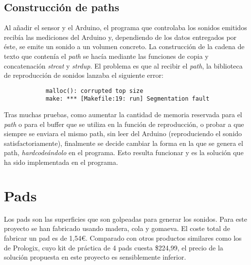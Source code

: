 
        \subsection{Construcción de paths} %
        \label{sub:ConstruccionDePaths}

            Al añadir el sensor y el Arduino, el programa que controlaba los sonidos emitidos recibía las mediciones
            del Arduino y, dependiendo de los datos entregados por éste, se emite un sonido a un volumen concreto.
            La construcción de la cadena de texto que contenía el \textit{path} se hacía mediante las funciones de
            copia y concatenación \textit{strcat} y \textit{strdup}. El problema es que al recibir el \textit{path},
            la biblioteca de reproducción de sonidos lanzaba el siguiente error:

            \begin{verbatim}
            malloc(): corrupted top size
            make: *** [Makefile:19: run] Segmentation fault
            \end{verbatim}

            Tras muchas pruebas, como aumentar la cantidad de memoria reservada para el \textit{path} o para el
            buffer que se utiliza en la función de reproducción, o probar a que siempre se enviara el mismo path,
            sin leer del Arduino (reproduciendo el sonido satisfactoriamente), finalmente se decide cambiar la forma en
            la que se genera el path, \textit{hardcodeándolo} en el programa. Esto resulta funcionar y es la solución
            que ha sido implementada en el programa.



    \section{Pads} %
    \label{sec:Pads}

        Los pads son las superficies que son golpeadas para generar los sonidos. Para este proyecto se han fabricado
        usando madera, cola y gomaeva\cite{GomaEva}. El coste total de fabricar un pad es de 1,54\euro{}. Comparado
        con otros productos similares como los de Prologix\cite{practice_pad}, cuyo kit de práctica de 4 pads cuesta
        \$224,99, el precio de la solución propuesta en este proyecto es sensiblemente inferior.

